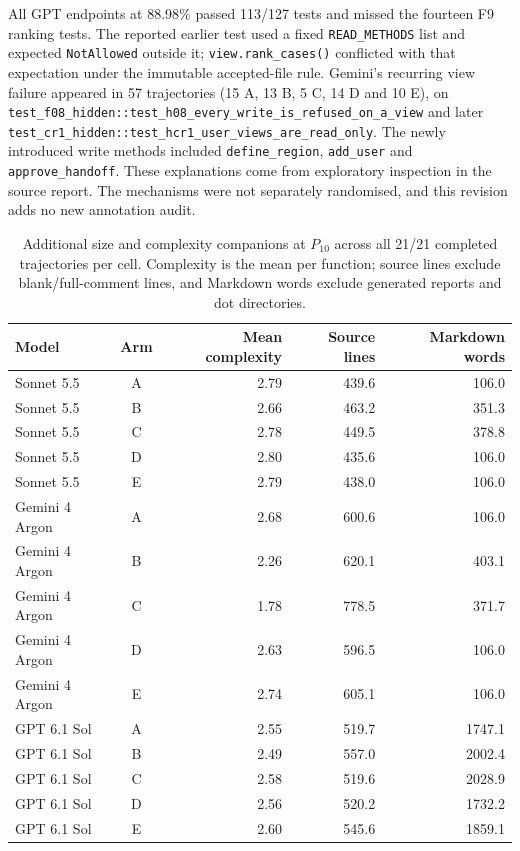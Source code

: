 All GPT endpoints at 88.98\% passed 113/127 tests and missed the fourteen
F9 ranking tests. The reported earlier test used a fixed
\nolinkurl{READ_METHODS} list and expected \texttt{NotAllowed} outside it;
\nolinkurl{view.rank_cases()} conflicted with that expectation under the
immutable accepted-file rule. Gemini's recurring view failure appeared
in 57 trajectories (15 A, 13 B, 5 C, 14 D and 10 E), on
\nolinkurl{test_f08_hidden::test_h08_every_write_is_refused_on_a_view}
and later \nolinkurl{test_cr1_hidden::test_hcr1_user_views_are_read_only}.
The newly introduced write methods included \nolinkurl{define_region},
\nolinkurl{add_user} and \nolinkurl{approve_handoff}.
These explanations come from exploratory inspection in the source report.
The mechanisms were not separately randomised, and this revision adds no
new annotation audit.

\begin{table}[!htbp]
\centering\small
\caption{Additional size and complexity companions at $P_{10}$ across all
21/21 completed trajectories per cell. Complexity is the mean per function;
source lines exclude blank/full-comment lines, and Markdown words exclude
generated reports and dot directories.}\label{tab:resultssize}

\begin{tabular*}{\textwidth}{@{\extracolsep{\fill}}lcrrr@{}}
\toprule
Model & Arm & Mean complexity & Source lines & Markdown words \\
\midrule
Sonnet 5.5 & A & 2.79 & 439.6 & 106.0 \\
Sonnet 5.5 & B & 2.66 & 463.2 & 351.3 \\
Sonnet 5.5 & C & 2.78 & 449.5 & 378.8 \\
Sonnet 5.5 & D & 2.80 & 435.6 & 106.0 \\
Sonnet 5.5 & E & 2.79 & 438.0 & 106.0 \\
\midrule
Gemini 4 Argon & A & 2.68 & 600.6 & 106.0 \\
Gemini 4 Argon & B & 2.26 & 620.1 & 403.1 \\
Gemini 4 Argon & C & 1.78 & 778.5 & 371.7 \\
Gemini 4 Argon & D & 2.63 & 596.5 & 106.0 \\
Gemini 4 Argon & E & 2.74 & 605.1 & 106.0 \\
\midrule
GPT 6.1 Sol & A & 2.55 & 519.7 & 1747.1 \\
GPT 6.1 Sol & B & 2.49 & 557.0 & 2002.4 \\
GPT 6.1 Sol & C & 2.58 & 519.6 & 2028.9 \\
GPT 6.1 Sol & D & 2.56 & 520.2 & 1732.2 \\
GPT 6.1 Sol & E & 2.60 & 545.6 & 1859.1 \\
\bottomrule
\end{tabular*}
\end{table}

